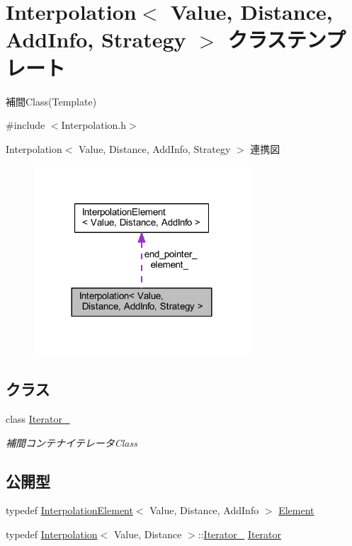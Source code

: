 \hypertarget{class_interpolation}{}\section{Interpolation$<$ Value, Distance, Add\+Info, Strategy $>$ クラステンプレート}
\label{class_interpolation}


補間\+Class(\+Template)  




{\ttfamily \#include $<$Interpolation.\+h$>$}



Interpolation$<$ Value, Distance, Add\+Info, Strategy $>$ 連携図\nopagebreak
\begin{figure}[H]
\begin{center}
\leavevmode
\includegraphics[width=228pt]{class_interpolation__coll__graph}
\end{center}
\end{figure}
\subsection*{クラス}
\begin{DoxyCompactItemize}
\item 
class \mbox{\hyperlink{class_interpolation_1_1_iterator__}{Iterator\+\_\+}}
\begin{DoxyCompactList}\small\item\em 補間コンテナイテレータ\+Class \end{DoxyCompactList}\end{DoxyCompactItemize}
\subsection*{公開型}
\begin{DoxyCompactItemize}
\item 
typedef \mbox{\hyperlink{class_interpolation_element}{Interpolation\+Element}}$<$ Value, Distance, Add\+Info $>$ \mbox{\hyperlink{class_interpolation_a01e71544809483d7a2ee72fe0007bcb0}{Element}}
\item 
typedef \mbox{\hyperlink{class_interpolation}{Interpolation}}$<$ Value, Distance $>$\+::\mbox{\hyperlink{class_interpolation_1_1_iterator__}{Iterator\+\_\+}} \mbox{\hyperlink{class_interpolation_a066eb9906faf7f1d56ba68d00c6be64a}{Iterator}}
\end{DoxyCompactItemize}
